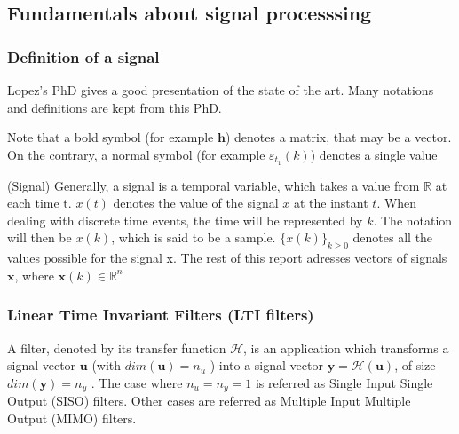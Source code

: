 	\subsection{Fundamentals about signal processsing}
	\subsubsection{Definition of a signal}
	Lopez's PhD \cite{lopez} gives a good presentation of the state of the art.
	Many notations and definitions are kept from this PhD.

	Note that a bold symbol (for example $\boldsymbol{h}$) denotes a matrix, that may be a vector.
	On the contrary, a normal symbol (for example $\varepsilon_{t_1}(k)$) denotes a single value

	\begin{thdef}\label{sig} (Signal)
		Generally, a signal is a temporal variable, which takes a value from $\mathbb{R}$ at each time t.
		$x(t)$ denotes the value of the signal $x$ at the instant $t$.
		When dealing with discrete time events, the time will be represented by $k$.
		The notation will then be $x(k)$, which is said to be a sample.
		$\{x(k)\}_{k \geq 0}$ denotes all the values possible for the signal x.
		The rest of this report adresses vectors of signals $\textbf{x}$, where $\textbf{x}(k) \in \mathbb{R}^{n}$
	\end{thdef}


	\subsubsection{Linear Time Invariant Filters (LTI filters)}
	A filter, denoted by its transfer function $\mathcal{H}$, is an application which transforms a signal vector $\boldsymbol{u}$ (with $dim(\boldsymbol{u}) = n_u$ )
	into a signal vector $\boldsymbol{y} = \mathcal{H}(\boldsymbol{u})$, of size $dim(\boldsymbol{y}) = n_y$ . The case where $n_u = n_y = 1$ is referred as Single Input Single Output
	(SISO) filters. Other cases are referred as Multiple Input Multiple Output (MIMO) filters.

